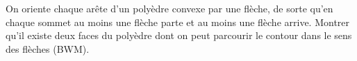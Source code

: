 On oriente chaque arête d'un polyèdre convexe par une flèche, de sorte qu'en chaque sommet au moins une flèche parte et au moins une flèche arrive. Montrer qu'il existe deux faces du polyèdre dont on peut parcourir le contour dans le sens des flèches (BWM).
